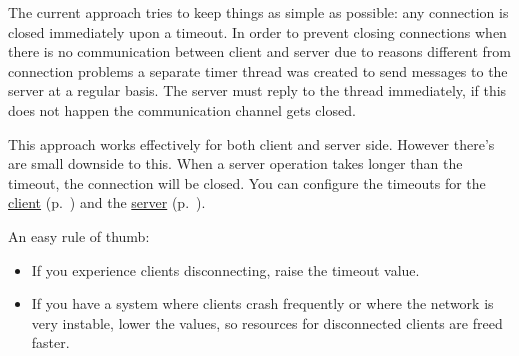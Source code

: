 The current approach tries to keep things as simple as possible: any connection is closed immediately upon a timeout. In order to prevent closing connections when there is no communication between client and server due to reasons different from connection problems a separate timer thread was created to send messages to the server at a regular basis. The server must reply to the thread immediately, if this does not happen the communication channel gets closed.

This approach works effectively for both client and server side. However there's are small downside to this. When a server operation takes longer than the timeout, the connection will be closed. You can configure the timeouts for the \hyperref[ref:configuration-client-timeout-client-socket]{client} (p.~\pageref{ref:configuration-client-timeout-client-socket}) and the \hyperref[ref:configuration-server-configuration]{server} (p.~\pageref{ref:configuration-server-configuration}).

An easy rule of thumb:

\begin{itemize}
\item If you experience clients disconnecting, raise the timeout value.
\item If you have a system where clients crash frequently or where the network is very instable, lower the values, so resources for disconnected clients are freed faster.
\end{itemize}

